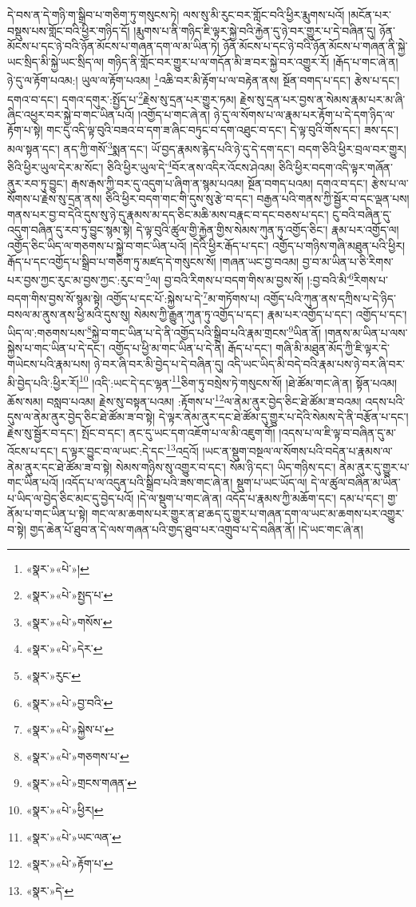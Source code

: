 དེ་བས་ན་དེ་གཉི་ག་སྒྲིབ་པ་གཅིག་ཏུ་གསུངས་ཏེ། ལས་སུ་མི་རུང་བར་གློང་བའི་ཕྱིར་རྨུགས་པའོ། །མངོན་པར་བསྡུས་པས་གློང་བའི་ཕྱིར་གཉིད་དོ། །རྨུགས་པ་ནི་གཉིད་ཇི་ལྟར་སྐྱེ་བའི་རྐྱེན་དུ་ཉེ་བར་གྱུར་པ་དེ་བཞིན་དུ། ཉོན་མོངས་པ་དང་ཉེ་བའི་ཉོན་མོངས་པ་གཞན་དག་ལ་མ་ཡིན་ཏེ། ཉོན་མོངས་པ་དང་ཉེ་བའི་ཉོན་མོངས་པ་གཞན་ནི་སྐྱེ་ཡང་སྲིད་མི་སྐྱེ་ཡང་སྲིད་ལ། གཉིད་ནི་གློང་བར་གྱུར་པ་ལ་གདོན་མི་ཟ་བར་སྐྱེ་བར་འགྱུར་རོ། །རྒོད་པ་གང་ཞེ་ན། ཉེ་དུ་ལ་རྟོག་པའམ:། ཡུལ་ལ་རྟོག་པའམ། \footnote{«སྣར་»«པེ་»།  }འཆི་བར་མི་རྟོག་པ་ལ་བརྟེན་ནས། སྔོན་བགད་པ་དང་། རྩེས་པ་དང་། དགའ་བ་དང་། དགའ་དགུར་:སྤྱོད་པ་\footnote{«སྣར་»«པེ་»སྤྱད་པ་}རྗེས་སུ་དྲན་པར་གྱུར་ཏམ། རྗེས་སུ་དྲན་པར་བྱས་ན་སེམས་རྣམ་པར་མ་ཞི་ཞིང་འཕྱར་བར་སྐྱེ་བ་གང་ཡིན་པའོ། །འགྱོད་པ་གང་ཞེ་ན། ཉེ་དུ་ལ་སོགས་པ་ལ་རྣམ་པར་རྟོག་པ་དེ་དག་ཉིད་ལ་རྟོག་པ་སྟེ། གང་དུ་འདི་ལྟ་བུའི་བཟའ་བ་དག་ཟ་ཞིང་བཏུང་བ་དག་འཐུང་བ་དང་། དེ་ལྟ་བུའི་གོས་དང་། ཟས་དང་། མལ་སྟན་དང་། ནད་ཀྱི་གསོ་\footnote{«སྣར་»«པེ་»གསོས་}སྨན་དང་། ཡོ་བྱད་རྣམས་རྙེད་པའི་ཉེ་དུ་དེ་དག་དང་། བདག་ཅིའི་ཕྱིར་བྲལ་བར་གྱུར། ཅིའི་ཕྱིར་ཡུལ་དེར་མ་སོང་། ཅིའི་ཕྱིར་ཡུལ་དེ་\footnote{«སྣར་»«པེ་»དེར་}བོར་ནས་འདིར་འོངས་ཤེའམ། ཅིའི་ཕྱིར་བདག་འདི་ལྟར་གཞོན་ནུར་རབ་ཏུ་བྱུང་། རྒས་རྒས་ཀྱི་བར་དུ་འདུག་པ་ཞིག་ན་སྙམ་པའམ། སྔོན་བགད་པའམ། དགའ་བ་དང་། རྩེས་པ་ལ་སོགས་པ་རྗེས་སུ་དྲན་ནས། ཅིའི་ཕྱིར་བདག་གང་གི་དུས་སུ་རྩེ་བ་དང་། བརྒྱན་པའི་གནས་ཀྱི་སྦྱོར་བ་དང་ལྡན་པས། གནས་པར་བྱ་བ་དེའི་དུས་སུ་ཉེ་དུ་རྣམས་མ་དད་ཅིང་མཆི་མས་བརྣང་བ་དང་བཅས་པ་དང་། ངུ་བའི་བཞིན་དུ་འདུག་བཞིན་དུ་རབ་ཏུ་བྱུང་སྙམ་སྟེ། དེ་ལྟ་བུའི་ཚུལ་གྱི་རྐྱེན་གྱིས་སེམས་ཀུན་ཏུ་འགྱོད་ཅིང་། རྣམ་པར་འགྱོད་ལ། འགྱོད་ཅིང་ཡིད་ལ་གཅགས་པ་སྐྱེ་བ་གང་ཡིན་པའོ། །དེའི་ཕྱིར་རྒོད་པ་དང་། འགྱོད་པ་གཉིས་གཞི་མཐུན་པའི་ཕྱིར། རྒོད་པ་དང་འགྱོད་པ་སྒྲིབ་པ་གཅིག་ཏུ་མཛད་དེ་གསུངས་སོ། །གཞན་ཡང་བྱ་བའམ། བྱ་བ་མ་ཡིན་པ་ཅི་རིགས་པར་བྱས་ཀྱང་རུང་མ་བྱས་ཀྱང་:རུང་བ་\footnote{«སྣར་»རུང་}ལ། བྱ་བའི་རིགས་པ་བདག་གིས་མ་བྱས་སོ། །:བྱ་བའི་མི་\footnote{«སྣར་»«པེ་»བྱ་བའི་}རིགས་པ་བདག་གིས་བྱས་སོ་སྙམ་སྟེ། འགྱོད་པ་དང་པོ་:སྐྱེས་པ་དེ་\footnote{«སྣར་»«པེ་»སྐྱེས་པ་}མ་གཏོགས་པ། འགྱོད་པའི་ཀུན་ནས་དཀྲིས་པ་དེ་ཉིད་བསལ་མ་ནུས་ནས་ཕྱི་མའི་དུས་སུ། སེམས་ཀྱི་རྒྱུན་ཀུན་ཏུ་འགྱོད་པ་དང་། རྣམ་པར་འགྱོད་པ་དང་། འགྱོད་པ་དང་། ཡིད་ལ་:གཅགས་པས་\footnote{«སྣར་»«པེ་»གཅགས་པ་}སྐྱེ་བ་གང་ཡིན་པ་དེ་ནི་འགྱོད་པའི་སྒྲིབ་པའི་རྣམ་གྲངས་\footnote{«སྣར་»«པེ་»གྲངས་གཞན་}ཡིན་ནོ། །གནས་མ་ཡིན་པ་ལས་སྐྱེས་པ་གང་ཡིན་པ་དེ་དང་། འགྱོད་པ་ཕྱི་མ་གང་ཡིན་པ་དེ་ནི། རྒོད་པ་དང་། གཞི་མི་མཐུན་མོད་ཀྱི་ཇི་ལྟར་དེ་གཡེངས་པའི་རྣམ་པས། ཉེ་བར་ཞི་བར་མི་བྱེད་པ་དེ་བཞིན་དུ། འདི་ཡང་ཡིད་མི་བདེ་བའི་རྣམ་པས་ཉེ་བར་ཞི་བར་མི་བྱེད་པའི་:ཕྱིར་རོ།\footnote{«སྣར་»«པེ་»ཕྱིར།} །འདི་:ཡང་དེ་དང་ལྷན་\footnote{«སྣར་»«པེ་»ཡང་ལན་}ཅིག་ཏུ་བསྲེས་ཏེ་གསུངས་སོ། །ཐེ་ཚོམ་གང་ཞེ་ན། སྟོན་པའམ། ཆོས་སམ། བསླབ་པའམ། རྗེས་སུ་བསྟན་པའམ། :རྟོགས་པ་\footnote{«སྣར་»«པེ་»རྟོག་པ་}ལ་ནེམ་ནུར་བྱེད་ཅིང་ཐེ་ཚོམ་ཟ་བའམ། འདས་པའི་དུས་ལ་ནེམ་ནུར་བྱེད་ཅིང་ཐེ་ཚོམ་ཟ་བ་སྟེ། དེ་ལྟར་ནེམ་ནུར་དང་ཐེ་ཚོམ་དུ་གྱུར་པ་དེའི་སེམས་དེ་ནི་བརྩོན་པ་དང་། རྗེས་སུ་སྦྱོར་བ་དང་། སྤོང་བ་དང་། ནང་དུ་ཡང་དག་འཇོག་པ་ལ་མི་འཇུག་གོ། །འདས་པ་ལ་ཇི་ལྟ་བ་བཞིན་དུ་མ་འོངས་པ་དང་། ད་ལྟར་བྱུང་བ་ལ་ཡང་:དེ་དང་\footnote{«སྣར་»དེ་}འདྲའོ། །ཡང་ན་སྡུག་བསྔལ་ལ་སོགས་པའི་བདེན་པ་རྣམས་ལ་ནེམ་ནུར་དང་ཐེ་ཚོམ་ཟ་བ་སྟེ། སེམས་གཉིས་སུ་འགྱུར་བ་དང་། སོམ་ཉི་དང་། ཡིད་གཉིས་དང་། ནེམ་ནུར་དུ་གྱུར་པ་གང་ཡིན་པའོ། །འདོད་པ་ལ་འདུན་པའི་སྒྲིབ་པའི་ཟས་གང་ཞེ་ན། སྡུག་པ་ཡང་ཡོད་ལ། དེ་ལ་ཚུལ་བཞིན་མ་ཡིན་པ་ཡིད་ལ་བྱེད་ཅིང་མང་དུ་བྱེད་པའོ། །དེ་ལ་སྡུག་པ་གང་ཞེ་ན། འདོད་པ་རྣམས་ཀྱི་མཆོག་དང་། དམ་པ་དང་། གྱ་ནོམ་པ་གང་ཡིན་པ་སྟེ། གང་ལ་མ་ཆགས་པར་གྱུར་ན་ཐ་ཆད་དུ་གྱུར་པ་གཞན་དག་ལ་ཡང་མ་ཆགས་པར་འགྱུར་བ་སྟེ། གྱད་ཆེན་པོ་ཐུབ་ན་དེ་ལས་གཞན་པའི་གྱད་ཐུབ་པར་འགྲུབ་པ་དེ་བཞིན་ནོ། །དེ་ཡང་གང་ཞེ་ན། 